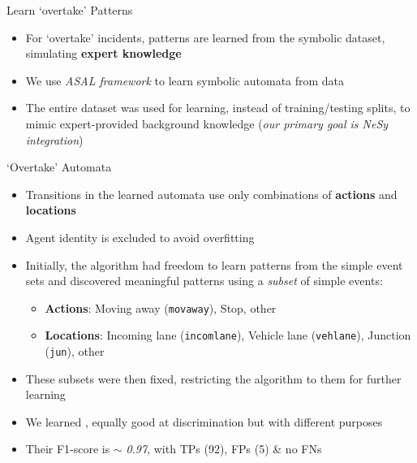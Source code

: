 \documentclass[10pt, aspectratio=169]{beamer}
\begin{document}
\begin{frame}{Learn `overtake' Patterns}
    \begin{itemize}
        \setlength{\itemsep}{15pt}
        \item For `overtake' incidents, patterns are learned from the symbolic dataset, simulating \textbf{expert knowledge}
        \item We use \textit{ASAL framework} to learn symbolic automata from data
        \item The \textcolor{umBlueLighter}{entire dataset} was used for learning, instead of training/testing splits, to mimic expert-provided background knowledge (\textit{our primary goal is NeSy integration})
    \end{itemize}
\end{frame}

\begin{frame}{`Overtake' Automata}
    \begin{itemize}
    \setlength{\itemsep}{10pt}
    \item Transitions in the learned automata use only combinations of \textbf{actions} and \textbf{locations}
    \item Agent identity is excluded to avoid overfitting
    \item Initially, the algorithm had freedom to learn patterns from the simple event sets and discovered meaningful patterns using a \textit{subset} of simple events:
    \vspace{5pt}
    \begin{itemize}
        \setlength{\itemsep}{3pt}
        \item \textbf{Actions}: Moving away (\texttt{movaway}), Stop, other
        \item \textbf{Locations}: Incoming lane (\texttt{incomlane}), Vehicle lane (\texttt{vehlane}), Junction (\texttt{jun}), other
    \end{itemize}
    \item These subsets were then fixed, restricting the algorithm to them for further learning
    \item We learned , equally good at discrimination but with different purposes
    \item Their F1-score is $\sim$ \textit{0.97}, with TPs (92), FPs (5) \& no FNs
\end{itemize}
\end{frame}
\end{document}
